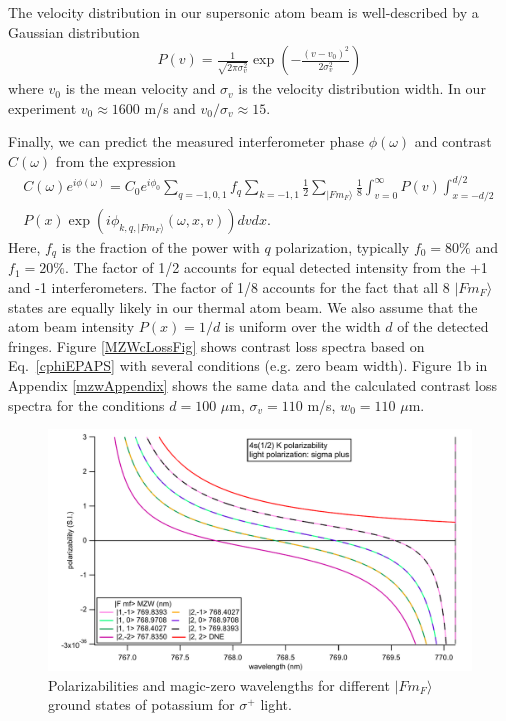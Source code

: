 The velocity distribution in our supersonic atom beam is well-described by a Gaussian distribution
\begin{eqnarray}
\label{PveqnEPAPS}
P(v)=\frac{1}{\sqrt{2\pi\sigma_v^2}}\exp\left(-\frac{(v-v_0)^2}{2\sigma_v^2}\right)
\end{eqnarray}
where $v_0$ is the mean velocity and $\sigma_v$ is the velocity distribution width. In our experiment $v_0\approx1600$ m/s and $v_0/\sigma_v\approx15$.


Finally, we can predict the measured interferometer phase $\phi(\omega)$ and contrast $C(\omega)$ from the expression
\begin{eqnarray}
\label{cphiEPAPS}
C(\omega)e^{i\phi(\omega)}=C_0e^{i\phi_0}\sum_{q=-1,0,1}f_q\sum_{k=-1,1}\frac{1}{2}\sum_{|Fm_F\rangle}\frac{1}{8}\int_{v=0}^\infty P(v)\int_{x=-d/2}^{d/2}\nonumber\\
P(x)\exp(i\phi_{k,q,|Fm_F\rangle}(\omega,x,v)) dv dx.
\end{eqnarray}
Here, $f_q$ is the fraction of the power with $q$ polarization, typically $f_{0}=80\%$ and $f_{1}=20\%$. The factor of 1/2 accounts for equal detected intensity from the +1 and -1 interferometers. The factor of 1/8 accounts for the fact that all 8 $|Fm_F\rangle$ states are equally likely in our thermal atom beam. We also assume that the atom beam intensity $P(x)=1/d$ is uniform over the width $d$ of the detected fringes. Figure \ref{MZWcLossFig} shows contrast loss spectra based on Eq.~\ref{cphiEPAPS} with several conditions (e.g. zero beam width). Figure 1b in Appendix \ref{mzwAppendix} shows the same data and the calculated contrast loss spectra for the conditions $d=100$ $\mu$m, $\sigma_v=110$ m/s, $w_0=110$ $\mu$m. 


\begin{figure}
\centerline{\includegraphics[width=.90\textwidth]{Figures/sigmaPlusMZW.pdf}}
\caption{\label{sigmaPlusMZW}Polarizabilities and magic-zero wavelengths for different $|Fm_F\rangle$ ground states of potassium for $\sigma^+$ light.}
\end{figure}


